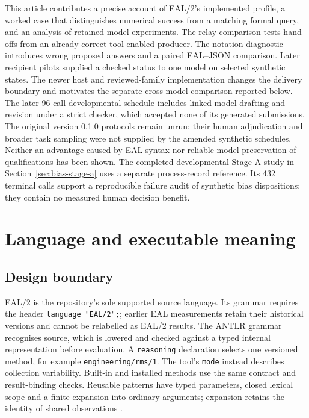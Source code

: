 \documentclass[preprint,12pt]{elsarticle}
\begin{document}
This article contributes a precise account of EAL/2's implemented profile, a worked case that distinguishes numerical success from a matching formal query, and an analysis of retained model experiments. The relay comparison tests hand-offs from an already correct tool-enabled producer. The notation diagnostic introduces wrong proposed answers and a paired EAL--JSON comparison. Later recipient pilots supplied a checked status to one model on selected synthetic states. The newer host and reviewed-family implementation changes the delivery boundary and motivates the separate cross-model comparison reported below. The later 96-call developmental schedule includes linked model drafting and revision under a strict checker, which accepted none of its generated submissions. The original version 0.1.0 protocols remain unrun: their human adjudication and broader task sampling were not supplied by the amended synthetic schedules. Neither an advantage caused by EAL syntax nor reliable model preservation of qualifications has been shown. The completed developmental Stage A study in Section~\ref{sec:bias-stage-a} uses a separate process-record reference. Its 432 terminal calls support a reproducible failure audit of synthetic bias dispositions; they contain no measured human decision benefit.

\section{Language and executable meaning}\label{sec:language}
\subsection{Design boundary}
EAL/2 is the repository's sole supported source language. Its grammar requires the header \texttt{language "EAL/2";}; earlier EAL measurements retain their historical versions and cannot be relabelled as EAL/2 results. The ANTLR grammar recognises source, which is lowered and checked against a typed internal representation before evaluation. A \texttt{reasoning} declaration selects one versioned method, for example \texttt{engineering/rms/1}. The tool's \texttt{mode} instead describes collection variability. Built-in and installed methods use the same contract and result-binding checks. Reusable patterns have typed parameters, closed lexical scope and a finite expansion into ordinary arguments; expansion retains the identity of shared observations \citep{earlDesign}.
\end{document}
